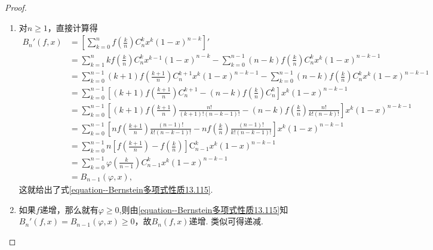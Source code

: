 \documentclass[../../main.tex]{subfiles}%
\begin{document}
\begin{proof}
\begin{enumerate}[(1)]
\item 对\(n\geqslant1\)，直接计算得
\begin{align*}
B_n'(f,x)&=\left[\sum_{k = 0}^n f\left(\frac{k}{n}\right)C_n^k x^k(1 - x)^{n - k}\right]'\\
&=\sum_{k = 1}^n kf\left(\frac{k}{n}\right)C_n^k x^{k - 1}(1 - x)^{n - k}-\sum_{k = 0}^{n - 1}(n - k)f\left(\frac{k}{n}\right)C_n^k x^k(1 - x)^{n - k - 1}\\
&=\sum_{k = 0}^{n - 1}(k + 1)f\left(\frac{k + 1}{n}\right)C_n^{k + 1}x^k(1 - x)^{n - k - 1}-\sum_{k = 0}^{n - 1}(n - k)f\left(\frac{k}{n}\right)C_n^k x^k(1 - x)^{n - k - 1}\\
&=\sum_{k=0}^{n-1}{\left[ \left( k+1 \right) f\left( \frac{k+1}{n} \right) C_{n}^{k+1}-\left( n-k \right) f\left( \frac{k}{n} \right) C_{n}^{k} \right] x^k\left( 1-x \right) ^{n-k-1}}
\\
&=\sum_{k=0}^{n-1}{\left[ \left( k+1 \right) f\left( \frac{k+1}{n} \right) \frac{n!}{\left( k+1 \right) !\left( n-k-1 \right) !}-\left( n-k \right) f\left( \frac{k}{n} \right) \frac{n!}{k!\left( n-k \right) !} \right] x^k\left( 1-x \right) ^{n-k-1}}
\\
&=\sum_{k=0}^{n-1}{\left[ nf\left( \frac{k+1}{n} \right) \frac{\left( n-1 \right) !}{k!\left( n-k-1 \right) !}-nf\left( \frac{k}{n} \right) \frac{\left( n-1 \right) !}{k!\left( n-k-1 \right) !} \right] x^k\left( 1-x \right) ^{n-k-1}}
\\
&=\sum_{k=0}^{n-1}{n\left[ f\left( \frac{k+1}{n} \right) -f\left( \frac{k}{n} \right) \right] \mathrm{C}_{n-1}^{k}x^k\left( 1-x \right) ^{n-k-1}}
\\
&=\sum_{k = 0}^{n - 1}\varphi\left(\frac{k}{n - 1}\right)C_{n - 1}^k x^k(1 - x)^{n - k - 1}\\
&=B_{n - 1}(\varphi,x),
\end{align*}
这就给出了式\eqref{equation--Bernstein多项式性质13.115}. 

\item 如果\(f\)递增，那么就有$\varphi\geqslant 0$,则由\eqref{equation--Bernstein多项式性质13.115}知\(B_n'(f,x)=B_{n - 1}(\varphi,x)\geqslant0\)，故\(B_n(f,x)\)递增. 类似可得递减.


\end{enumerate}
\end{proof}
\end{document}
